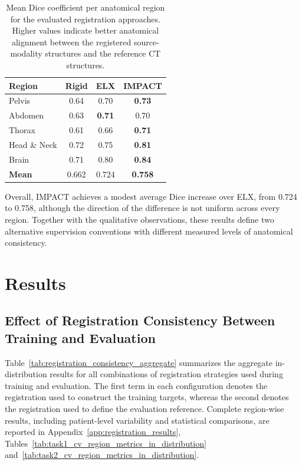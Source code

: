 \documentclass[lettersize,journal]{IEEEtran}
\begin{document}
\begin{table}[h!]
\centering
\caption{Mean Dice coefficient per anatomical region for the evaluated registration approaches. Higher values indicate better anatomical alignment between the registered source-modality structures and the reference CT structures.}
\label{tab:diceimpactreg}
\begin{tabular}{lccc}
\toprule
\textbf{Region} & \textbf{Rigid} & \textbf{ELX} & \textbf{IMPACT} \\
\midrule
Pelvis & 0.64 & 0.70 & \textbf{0.73} \\
Abdomen & 0.63 & \textbf{0.71} & 0.70 \\
Thorax & 0.61 & 0.66 & \textbf{0.71} \\
Head \& Neck & 0.72 & 0.75 & \textbf{0.81} \\
Brain & 0.71 & 0.80 & \textbf{0.84} \\
\midrule
\textbf{Mean} & 0.662 & 0.724 & \textbf{0.758} \\
\bottomrule
\end{tabular}

\end{table}

Overall, IMPACT achieves a modest average Dice increase over ELX, from 0.724 to 0.758, although the direction of the difference is not uniform across every region. Together with the qualitative observations, these results define two alternative supervision conventions with different measured levels of anatomical consistency. 

\section{Results}

\subsection{Effect of Registration Consistency Between Training and Evaluation}

Table~\ref{tab:registration_consistency_aggregate} summarizes the aggregate in-distribution results for all combinations of registration strategies used during training and evaluation. The first term in each configuration denotes the registration used to construct the training targets, whereas the second denotes the registration used to define the evaluation reference. Complete region-wise results, including patient-level variability and statistical comparisons, are reported in Appendix~\ref{app:registration_results}, Tables~\ref{tab:task1_cv_region_metrics_in_distribution} and~\ref{tab:task2_cv_region_metrics_in_distribution}.
\end{document}
